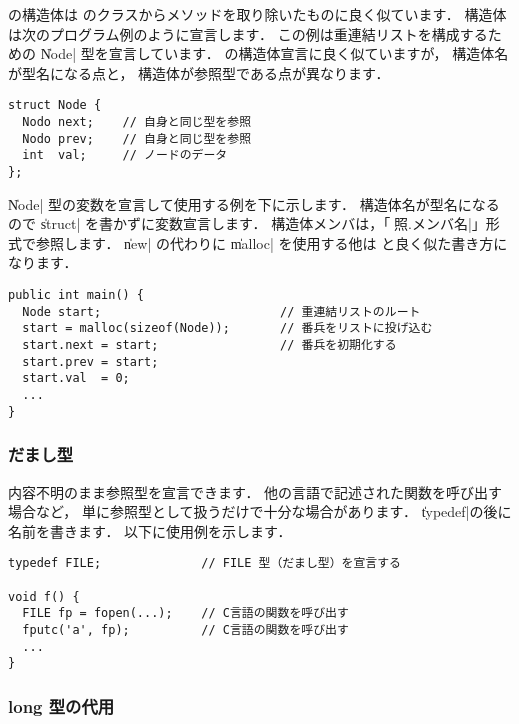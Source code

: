 \label{chap3:struct}
\cmml の構造体は \javal のクラスからメソッドを取り除いたものに良く似ています．
構造体は次のプログラム例のように宣言します．
この例は重連結リストを構成するための \|Node| 型を宣言しています．
\cl の構造体宣言に良く似ていますが，
構造体名が型名になる点と，
構造体が参照型である点が異なります．

\begin{mylist}
\begin{verbatim}
struct Node {
  Nodo next;    // 自身と同じ型を参照
  Nodo prev;    // 自身と同じ型を参照
  int  val;     // ノードのデータ
};
\end{verbatim}
\end{mylist}

\|Node| 型の変数を宣言して使用する例を下に示します．
構造体名が型名になるので \|struct| を書かずに変数宣言します．
構造体メンバは，「\|参照.メンバ名|」形式で参照します．
\|new| の代わりに \|malloc| を使用する他は
\javal と良く似た書き方になります．

\begin{mylist}
\begin{verbatim}
public int main() {
  Node start;                         // 重連結リストのルート
  start = malloc(sizeof(Node));       // 番兵をリストに投げ込む
  start.next = start;                 // 番兵を初期化する
  start.prev = start;
  start.val  = 0;
  ...
}
\end{verbatim}
\end{mylist}

\subsubsection{だまし型}

内容不明のまま参照型を宣言できます．
他の言語で記述された関数を呼び出す場合など，
単に参照型として扱うだけで十分な場合があります．
\|typedef|の後に名前を書きます．
以下に使用例を示します．

\begin{mylist}
\begin{verbatim}
typedef FILE;              // FILE 型（だまし型）を宣言する

void f() {
  FILE fp = fopen(...);    // C言語の関数を呼び出す
  fputc('a', fp);          // C言語の関数を呼び出す
  ...
}
\end{verbatim}
\end{mylist}

\subsubsection{long 型の代用}

